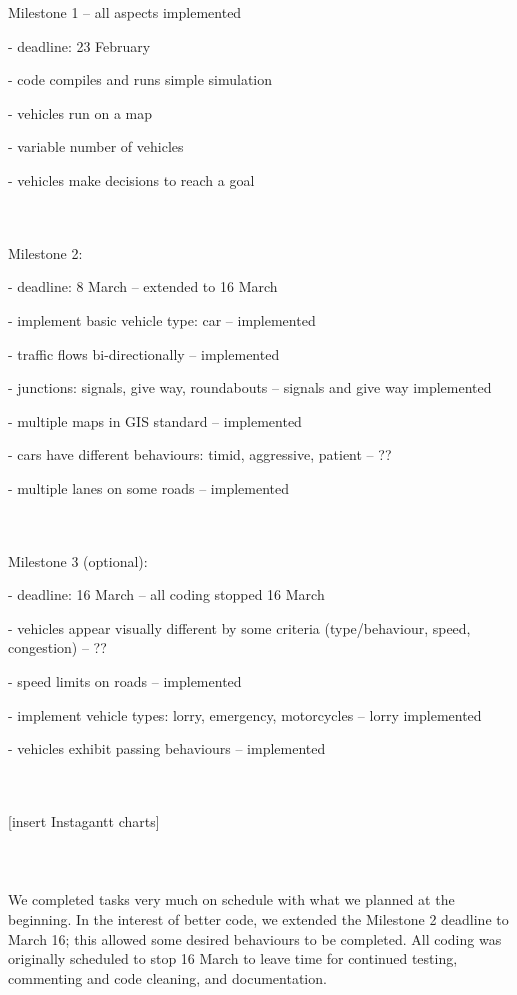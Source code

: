 \documentclass[11pt]{article}
\begin{document}
Milestone 1 – all aspects implemented


- deadline: 23 February 

- code compiles and runs simple simulation

- vehicles run on a map

- variable number of vehicles

- vehicles make decisions to reach a goal

\\ \\

Milestone 2:

- deadline: 8 March – extended to 16 March

- implement basic vehicle type: car – implemented 

- traffic flows bi-directionally – implemented 

- junctions: signals, give way, roundabouts – signals and give way implemented

- multiple maps in GIS standard – implemented 

- cars have different behaviours: timid, aggressive, patient – ?? 

- multiple lanes on some roads – implemented 

\\ \\

Milestone 3 (optional):

- deadline: 16 March – all coding stopped 16 March

- vehicles appear visually different by some criteria (type/behaviour, speed, congestion) – ??

- speed limits on roads – implemented 

- implement vehicle types: lorry, emergency, motorcycles – lorry implemented

- vehicles exhibit passing behaviours – implemented

\\ \\

[insert Instagantt charts]\\ \\
\\ \\
 We completed tasks very much on schedule with what we planned at the beginning. In the interest of better code, we extended the Milestone 2 deadline to March 16; this allowed some desired behaviours to be completed. All coding was originally scheduled to stop 16 March to leave time for continued testing, commenting and code cleaning, and documentation. 
\\ \\
\end{document}
